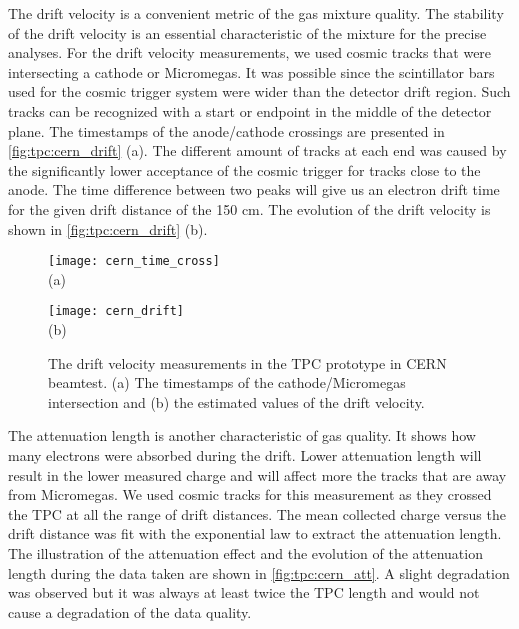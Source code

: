 \documentclass[../main.tex]{subfiles}
\begin{document}
The drift velocity is a convenient metric of the gas mixture quality. The stability of the drift velocity is an essential characteristic of the mixture for the precise analyses. For the drift velocity measurements, we used cosmic tracks that were intersecting a cathode or Micromegas. It was possible since the scintillator bars used for the cosmic trigger system were wider than the detector drift region. Such tracks can be recognized with a start or endpoint in the middle of the detector plane. The timestamps of the anode/cathode crossings are presented in \autoref{fig:tpc:cern_drift} (a). The different amount of tracks at each end was caused by the significantly lower acceptance of the cosmic trigger for tracks close to the anode. The time difference between two peaks will give us an electron drift time for the given drift distance of the 150 cm. The evolution of the drift velocity is shown in \autoref{fig:tpc:cern_drift} (b).

\begin{figure}[!ht]
  \centering
  \begin{minipage}{0.49\linewidth}
    \centering
    \texttt{[image: cern\_time\_cross]} \\ (a)
  \end{minipage}
  \begin{minipage}{0.49\linewidth}
    \centering
    \texttt{[image: cern\_drift]} \\ (b)
  \end{minipage}
  \caption{The drift velocity measurements in the TPC prototype in CERN beamtest. (a) The timestamps of the cathode/Micromegas intersection and (b) the estimated values  of the drift velocity.}
  \label{fig:tpc:cern_drift}
\end{figure}

The attenuation length is another characteristic of gas quality. It shows how many electrons were absorbed during the drift. Lower attenuation length will result in the lower measured charge and will affect more the tracks that are away from Micromegas. We used cosmic tracks for this measurement as they crossed the TPC at all the range of drift distances. The mean collected charge versus the drift distance was fit with the exponential law to extract the attenuation length. The illustration of the attenuation effect and the evolution of the attenuation length during the data taken are shown in \autoref{fig:tpc:cern_att}. A slight degradation was observed but it was always at least twice the TPC length and would not cause a degradation of the data quality.
\end{document}
